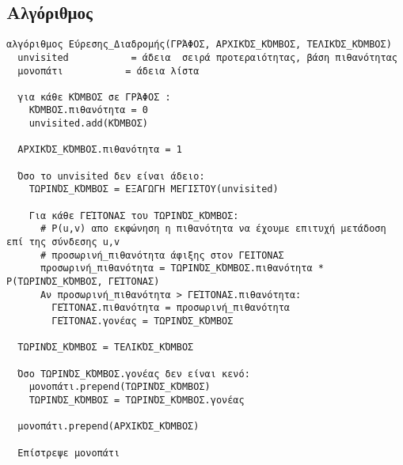 \documentclass[11pt]{article}
\begin{document}
\subsection{Αλγόριθμος}
\label{sec:orgff314de}
\begin{verbatim}
αλγόριθμος Εύρεσης_Διαδρομής(ΓΡΆΦΟΣ, ΑΡΧΙΚΌΣ_ΚΌΜΒΟΣ, ΤΕΛΙΚΌΣ_ΚΌΜΒΟΣ)
  unvisited           = άδεια  σειρά προτεραιότητας, βάση πιθανότητας
  μονοπάτι           = άδεια λίστα 

  για κάθε ΚΌΜΒΟΣ σε ΓΡΆΦΟΣ :
    ΚΌΜΒΟΣ.πιθανότητα = 0
    unvisited.add(ΚΌΜΒΟΣ)
  
  ΑΡΧΙΚΌΣ_ΚΌΜΒΟΣ.πιθανότητα = 1

  Όσο το unvisited δεν είναι άδειο:
    ΤΩΡΙΝΌΣ_ΚΌΜΒΟΣ = ΕΞΑΓΩΓΗ ΜΕΓΙΣΤΟΥ(unvisited)
    
    Για κάθε ΓΕΊΤΟΝΑΣ του ΤΩΡΙΝΌΣ_ΚΌΜΒΟΣ:
      # P(u,v) απο εκφώνηση η πιθανότητα να έχουμε επιτυχή μετάδοση επί της σύνδεσης u,v
      # προσωρινή_πιθανότητα άφιξης στον ΓΕΙΤΟΝΑΣ
      προσωρινή_πιθανότητα = ΤΩΡΙΝΌΣ_ΚΌΜΒΟΣ.πιθανότητα * P(ΤΩΡΙΝΌΣ_ΚΌΜΒΟΣ, ΓΕΊΤΟΝΑΣ)
      Αν προσωρινή_πιθανότητα > ΓΕΊΤΟΝΑΣ.πιθανότητα:
        ΓΕΊΤΟΝΑΣ.πιθανότητα = προσωρινή_πιθανότητα
        ΓΕΊΤΟΝΑΣ.γονέας = ΤΩΡΙΝΌΣ_ΚΌΜΒΟΣ
 
  ΤΩΡΙΝΌΣ_ΚΌΜΒΟΣ = ΤΕΛΙΚΌΣ_ΚΌΜΒΟΣ
  
  Όσο ΤΩΡΙΝΌΣ_ΚΌΜΒΟΣ.γονέας δεν είναι κενό:
    μονοπάτι.prepend(ΤΩΡΙΝΌΣ_ΚΌΜΒΟΣ)
    ΤΩΡΙΝΌΣ_ΚΌΜΒΟΣ = ΤΩΡΙΝΌΣ_ΚΌΜΒΟΣ.γονέας 
  
  μονοπάτι.prepend(ΑΡΧΙΚΌΣ_ΚΌΜΒΟΣ)
  
  Επίστρεψε μονοπάτι
\end{verbatim}
\end{document}
